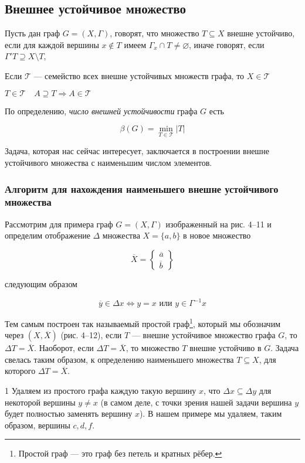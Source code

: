 \subsection{Внешнее устойчивое множество}

Пусть дан граф $G = (X, \Gamma)$, говорят, что множество $T \subseteq X$ внешне устойчиво, если для каждой вершины $x \notin T$ имеем $\Gamma_x \cap T \neq \varnothing$, иначе говорят, если $\Gamma' T \supseteq X \setminus T$,

Если $\mathcal{T}$ — семейство всех внешне устойчивых множеств графа, то $X \in \mathcal{T}$

$T \in \mathcal{T} \quad A \supseteq T \Rightarrow A \in \mathcal{T}$

По определению, \textit{число внешней устойчивости} графа $G$ есть

\[
\beta(G) = \min_{T \in \mathcal{T}} |T|
\]

Задача, которая нас сейчас интересует, заключается в построении внешне устойчивого множества с наименьшим числом элементов.

\subsubsection*{Алгоритм для нахождения наименьшего внешне устойчивого множества}

Рассмотрим для примера граф $G = (X, \Gamma)$ изображенный на рис. 4--11 и определим отображение $\Delta$ множества $X = \{a, b\}$ в новое множество

\[
\overline{X} = \left\{
\begin{array}{c}
\overline{a} \\
\overline{b}
\end{array}
\right\}
\]

следующим образом

\[
\overline{y} \in \Delta x \iff y = x \text{ или } y \in \Gamma^{-1} x
\]

Тем самым построен так называемый простой граф\footnote{Простой граф --- это граф без петель и кратных рёбер.}, который мы обозначим через $(X, \overline{X})$ (рис. 4--12), если $T$ --- внешне устойчивое множество графа $G$, то $\Delta T = \overline{X}$. Наоборот, если $\Delta T = \overline{X}$, то множество $T$ внешне устойчиво в $G$. Задача свелась таким образом, к определению наименьшего множества $T \subseteq X$, для которого $\Delta T = \overline{X}$.

1\textdegree{} Удаляем из простого графа каждую такую вершину $x$, что $\Delta x \subseteq \Delta y$ для некоторой вершины $y \neq x$ (в самом деле, с точки зрения нашей задачи вершина $y$ будет полностью заменять вершину $x$). В нашем примере мы удаляем, таким образом, вершины $c, d, f$.

